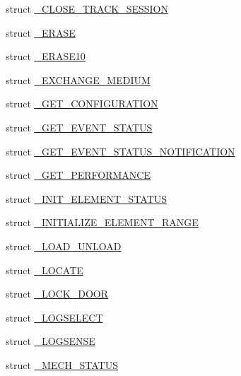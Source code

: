 \begin{DoxyCompactItemize}
\item 
struct \hyperlink{struct___c_d_b_1_1___c_l_o_s_e___t_r_a_c_k___s_e_s_s_i_o_n}{\+\_\+\+C\+L\+O\+S\+E\+\_\+\+T\+R\+A\+C\+K\+\_\+\+S\+E\+S\+S\+I\+ON}
\item 
struct \hyperlink{struct___c_d_b_1_1___e_r_a_s_e}{\+\_\+\+E\+R\+A\+SE}
\item 
struct \hyperlink{struct___c_d_b_1_1___e_r_a_s_e10}{\+\_\+\+E\+R\+A\+S\+E10}
\item 
struct \hyperlink{struct___c_d_b_1_1___e_x_c_h_a_n_g_e___m_e_d_i_u_m}{\+\_\+\+E\+X\+C\+H\+A\+N\+G\+E\+\_\+\+M\+E\+D\+I\+UM}
\item 
struct \hyperlink{struct___c_d_b_1_1___g_e_t___c_o_n_f_i_g_u_r_a_t_i_o_n}{\+\_\+\+G\+E\+T\+\_\+\+C\+O\+N\+F\+I\+G\+U\+R\+A\+T\+I\+ON}
\item 
struct \hyperlink{struct___c_d_b_1_1___g_e_t___e_v_e_n_t___s_t_a_t_u_s}{\+\_\+\+G\+E\+T\+\_\+\+E\+V\+E\+N\+T\+\_\+\+S\+T\+A\+T\+US}
\item 
struct \hyperlink{struct___c_d_b_1_1___g_e_t___e_v_e_n_t___s_t_a_t_u_s___n_o_t_i_f_i_c_a_t_i_o_n}{\+\_\+\+G\+E\+T\+\_\+\+E\+V\+E\+N\+T\+\_\+\+S\+T\+A\+T\+U\+S\+\_\+\+N\+O\+T\+I\+F\+I\+C\+A\+T\+I\+ON}
\item 
struct \hyperlink{struct___c_d_b_1_1___g_e_t___p_e_r_f_o_r_m_a_n_c_e}{\+\_\+\+G\+E\+T\+\_\+\+P\+E\+R\+F\+O\+R\+M\+A\+N\+CE}
\item 
struct \hyperlink{struct___c_d_b_1_1___i_n_i_t___e_l_e_m_e_n_t___s_t_a_t_u_s}{\+\_\+\+I\+N\+I\+T\+\_\+\+E\+L\+E\+M\+E\+N\+T\+\_\+\+S\+T\+A\+T\+US}
\item 
struct \hyperlink{struct___c_d_b_1_1___i_n_i_t_i_a_l_i_z_e___e_l_e_m_e_n_t___r_a_n_g_e}{\+\_\+\+I\+N\+I\+T\+I\+A\+L\+I\+Z\+E\+\_\+\+E\+L\+E\+M\+E\+N\+T\+\_\+\+R\+A\+N\+GE}
\item 
struct \hyperlink{struct___c_d_b_1_1___l_o_a_d___u_n_l_o_a_d}{\+\_\+\+L\+O\+A\+D\+\_\+\+U\+N\+L\+O\+AD}
\item 
struct \hyperlink{struct___c_d_b_1_1___l_o_c_a_t_e}{\+\_\+\+L\+O\+C\+A\+TE}
\item 
struct \hyperlink{struct___c_d_b_1_1___l_o_c_k___d_o_o_r}{\+\_\+\+L\+O\+C\+K\+\_\+\+D\+O\+OR}
\item 
struct \hyperlink{struct___c_d_b_1_1___l_o_g_s_e_l_e_c_t}{\+\_\+\+L\+O\+G\+S\+E\+L\+E\+CT}
\item 
struct \hyperlink{struct___c_d_b_1_1___l_o_g_s_e_n_s_e}{\+\_\+\+L\+O\+G\+S\+E\+N\+SE}
\item 
struct \hyperlink{struct___c_d_b_1_1___m_e_c_h___s_t_a_t_u_s}{\+\_\+\+M\+E\+C\+H\+\_\+\+S\+T\+A\+T\+US}

\end{DoxyCompactItemize}

